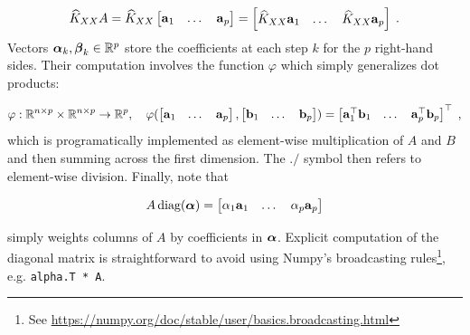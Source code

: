 \documentclass{article}
\begin{document}
\begin{equation*}
    \widehat K_{XX} A = \widehat K_{XX} \begin{bmatrix}
    \boldsymbol{\mathbf{a}}_1 & \dots & \boldsymbol{\mathbf{a}}_p
    \end{bmatrix}  = \begin{bmatrix}
    \widehat K_{XX} \boldsymbol{\mathbf{a}}_1 & \dots & \widehat K_{XX} \boldsymbol{\mathbf{a}}_p
    \end{bmatrix} \; .
\end{equation*}
%
Vectors $\boldsymbol{\mathbf{\alpha}}_k, \boldsymbol{\mathbf{\beta}}_k \in \mathbb R^{p}$ store the coefficients at each step $k$ for the $p$ right-hand sides. Their computation involves the function $\varphi$ which simply generalizes dot products:

\begin{equation*}
    \varphi: \mathbb R^{n \times p} \times \mathbb R^{n \times p} \to \mathbb R^{p}, \quad
    \varphi(\begin{bmatrix}
    \boldsymbol{\mathbf{a}}_1 & \dots & \boldsymbol{\mathbf{a}}_p
    \end{bmatrix}, \begin{bmatrix}
    \boldsymbol{\mathbf{b}}_1 & \dots & \boldsymbol{\mathbf{b}}_p
    \end{bmatrix})
    = \begin{bmatrix}
    \boldsymbol{\mathbf{a}}_1^\top \boldsymbol{\mathbf{b}}_1 & \dots & \boldsymbol{\mathbf{a}}_p^\top \boldsymbol{\mathbf{b}}_p
    \end{bmatrix}^\top \; ,
\end{equation*}
%
which is programatically implemented as element-wise multiplication of $A$ and $B$ and then summing across the first dimension. The $./$ symbol then refers to element-wise division. Finally, note that 

\begin{equation*}
    A \, \text{diag}(\boldsymbol{\mathbf{\alpha}}) = \begin{bmatrix} \alpha_1 \boldsymbol{\mathbf{a}}_1 & \dots & \alpha_p \boldsymbol{\mathbf{a}}_p \end{bmatrix}
\end{equation*}

simply weights columns of $A$ by coefficients in $\boldsymbol{\mathbf{\alpha}}$. Explicit computation of the diagonal matrix is straightforward to avoid using Numpy's broadcasting rules\footnote{See \url{https://numpy.org/doc/stable/user/basics.broadcasting.html}}, e.g. \texttt{alpha.T * A}. 
\end{document}
